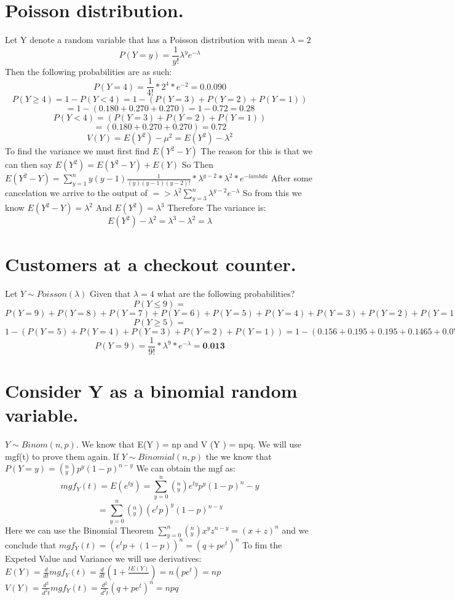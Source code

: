 \documentclass[a4paper, 12pt]{article}
\begin{document}
\section{Poisson distribution.}
Let Y denote a random variable that has a Poisson distribution with mean $\lambda = 2$
$$P(Y = y) = \frac{1}{y!}\lambda^ye^{-\lambda}$$
Then the following probabilities are as such:
$$P(Y = 4) = \frac{1}{4!} * 2^4 * e^{-2} = 0.0.090$$\newline
$$P(Y \geq 4) = 1 - P(Y < 4) = 1 - (P(Y = 3) + P(Y = 2) + P(Y = 1))$$ $$ = 1- (0.180 + 0.270 + 0.270) = 1 - 0.72 = 0.28$$\newline
$$P(Y < 4) = (P(Y = 3) + P(Y = 2) + P(Y = 1))$$ $$ = (0.180 + 0.270 + 0.270) = 0.72 $$\newline
$$V(Y) = E(Y^2) - \mu^2 = E(Y^2) - \lambda^2$$
To find the variance we must first find $E(Y^2-Y)$
The reason for this is that we can then say $E(Y^2) = E(Y^2-Y) + E(Y)$
So Then $E(Y^2-Y) = \sum_{y=1}^n y(y-1) \frac{1}{(y)(y-1)(y-2)!} * \lambda^{y-2}* \lambda^2 * e^{-lambda}$
After some cancelation we arrive to the output of $=> \lambda^2 \sum_{y=3}^n\lambda^{y-2}e^{-\lambda}$
So from this we know $E(Y^2-Y) = \lambda^2$
And $E(Y^2) = \lambda^3$
Therefore The variance is: 
 $$E(Y^2) - \lambda^2 = \lambda^3 - \lambda^2 = \lambda$$
\section{Customers at a checkout counter.}
Let $Y \sim Poisson(\lambda)$ Given that $\lambda = 4$ what are the following probabilities?
$$P(Y \leq 9) = $$ $ P(Y = 9) + P(Y = 8) + P(Y = 7) + P(Y = 6) + P(Y = 5) + P(Y = 4) + P(Y = 3) + P(Y = 2) + P(Y = 1)  = 0.013 + 0.029 + 0.059 + 
0.104 + 0.156 + 0.195 + 0.195 + 0.1465 + 0.0732 = \textbf{0.9707}$
$$P(Y \geq 5) = $$ $1 - (P(Y = 5) + P(Y = 4) + P(Y = 3) + P(Y = 2) + P(Y = 1)) = 1 - (0.156 + 0.195 + 0.195 + 0.1465 + 0.0732) = 1 - 0.7657 = \textbf{0.2343}$
$$P(Y = 9) = \frac{1}{9!} * \lambda^9 * e^{-\lambda} = \textbf{0.013}$$
\section{Consider Y as a binomial random variable.}
$Y \sim Binom(n, p)$. We know that E(Y ) = np and V (Y ) = npq. We will use mgf(t) to prove them again.
If $Y \sim Binomial(n, p)$ the we know that $P(Y= y) = (^n_y)p^y(1-p)^{n-y}$\newline
We can obtain the mgf as: $$ mgf_Y(t) = E(e^{ty}) = \sum_{y = 0}^n(^n_y)e^{ty}p^y(1-p)^n-y$$
$$ = \sum_{y=0}^n (^n_y)(e^tp)^y(1-p)^{n-y}$$
Here we can use the Binomial Theorem $\sum_{y=0}^n(^n_y)x^yz^{n-y} = (x + z)^n$
and we conclude that $mgf_Y(t) = (e^tp + (1-p))^n = (q +pe^t)^n$
\newline To fim the Expeted Value and Variance we will use derivatives:\newline
$E(Y) = \frac{d}{dt} mgf_Y(t) = \frac{d}{dt} (1 +  \frac{tE(Y)}{})= n(pe^t) = np$\newline
$V(Y) = \frac{d^2}{d^2t} mgf_Y(t) = \frac{d^2}{d^2t} (q + pe^t)^n = npq$
\end{document}
